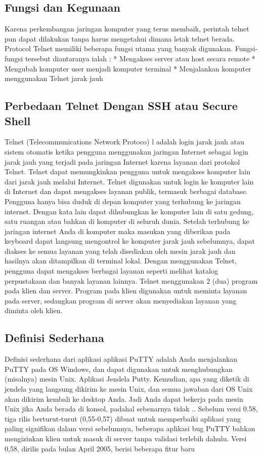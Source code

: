 \subsection {Fungsi dan Kegunaan}

Karena perkembangan jaringan komputer yang terus membaik, perintah telnet pun dapat dilakukan tanpa harus mengetahui dimana letak telnet berada. Protocol Telnet memiliki beberapa fungsi utama yang banyak digunakan. Fungsi-fungsi tersebut diantaranya ialah :
* Mengakses server atau host secara remote
* Mengubah komputer user menjadi komputer terminal
* Menjalankan komputer menggunakan Telnet jarak jauh

\subsection {Perbedaan Telnet Dengan SSH atau Secure Shell}

Telnet (Telecommunications Network Protoco) l adalah login jarak jauh atau sistem otomatis ketika pengguna menggunakan jaringan Internet sebagai login jarak jauh yang terjadi pada jaringan Internet karena layanan dari protokol Telnet. Telnet dapat memungkinkan pengguna untuk mengakses komputer lain dari jarak jauh melalui Internet. Telnet digunakan untuk login ke komputer lain di Internet dan dapat mengakses layanan publik, termasuk berbagai database. Pengguna hanya bisa duduk di depan komputer yang terhubung ke jaringan internet. Dengan kata lain dapat dihubungkan ke komputer lain di satu gedung, satu ruangan atau bahkan di komputer di seluruh dunia. Setelah terhubung ke jaringan internet Anda di komputer maka masukan yang diberikan pada keyboard dapat langsung mengontrol ke komputer jarak jauh sebelumnya, dapat diakses ke semua layanan yang telah disediakan oleh mesin jarak jauh dan hasilnya akan ditampilkan di terminal lokal. Dengan menggunakan Telnet, pengguna dapat mengakses berbagai layanan seperti melihat katalog perpustakaan dan banyak layanan lainnya. Telnet menggunakan 2 (dua) program pada klien dan server. Program pada klien digunakan untuk meminta layanan pada server, sedangkan program di server akan menyediakan layanan yang diminta oleh klien.

\subsection { Definisi Sederhana }

Definisi sederhana dari aplikasi aplikasi PuTTY adalah Anda menjalankan PuTTY pada OS Windows, dan dapat digunakan untuk menghubungkan (misalnya) mesin Unix. Aplikasi Jendela Putty. Kemudian, apa yang diketik di jendela yang langsung dikirim ke mesin Unix, dan semua jawaban dari OS Unix akan dikirim kembali ke desktop Anda. Jadi Anda dapat bekerja pada mesin Unix jika Anda berada di konsol, padahal sebenarnya tidak ..
Sebelum versi 0.58, tiga rilis berturut-turut (0,55-0,57) dibuat untuk memperbaiki aplikasi yang paling signifikan dalam versi sebelumnya, beberapa aplikasi bug PuTTY bahkan mengizinkan klien untuk masuk di server tanpa validasi terlebih dahulu. Versi 0,58, dirilis pada bulan April 2005, berisi beberapa fitur baru


